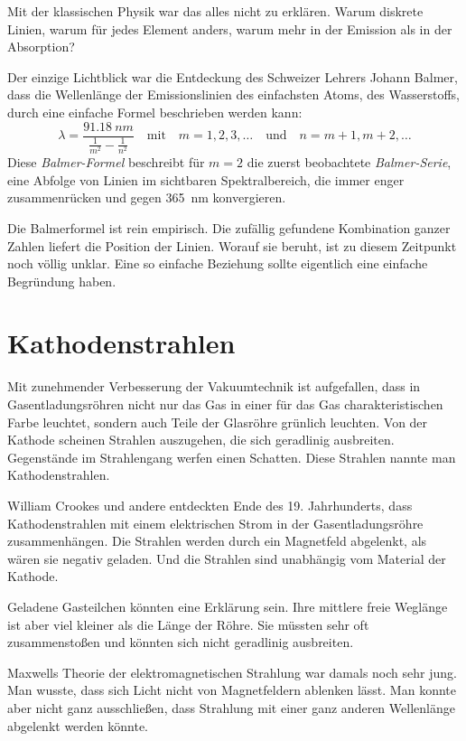 Mit der klassischen Physik war das alles nicht zu erklären. Warum diskrete Linien, warum für jedes Element anders, warum mehr in der Emission als in der Absorption?

Der einzige Lichtblick war die Entdeckung des Schweizer Lehrers Johann Balmer, dass die Wellenlänge der Emissionslinien des einfachsten Atoms, des Wasserstoffs, durch eine einfache Formel beschrieben werden kann:
\begin{equation}
    \lambda = \frac{\SI{91.18}{nm}}{ 
       \frac{1}{m^2} - \frac{1}{n^2} 
    }
    \quad \text{mit} \quad m = 1,2, 3, \dots \quad \text{und} \quad n = m+1, m+2, \dots
\end{equation}
Diese \emph{Balmer-Formel} beschreibt für $m=2$ die zuerst beobachtete \emph{Balmer-Serie}, eine Abfolge von Linien im sichtbaren Spektralbereich, die immer enger zusammenrücken und gegen 365~nm konvergieren.  

Die Balmerformel ist rein empirisch. Die zufällig gefundene Kombination ganzer Zahlen liefert die Position der Linien. Worauf sie beruht, ist zu diesem Zeitpunkt noch völlig unklar. Eine so einfache Beziehung sollte eigentlich eine einfache Begründung haben.


\section{Kathodenstrahlen}

Mit zunehmender Verbesserung der Vakuumtechnik ist aufgefallen, dass in Gasentladungsröhren nicht nur das Gas in einer für das Gas charakteristischen Farbe leuchtet, sondern auch Teile der Glasröhre grünlich leuchten.  Von der Kathode scheinen Strahlen auszugehen, die sich geradlinig ausbreiten. Gegenstände im Strahlengang werfen einen Schatten. Diese Strahlen nannte man Kathodenstrahlen.

William Crookes und andere entdeckten Ende des 19. Jahrhunderts, dass Kathodenstrahlen mit einem elektrischen Strom in der Gasentladungsröhre zusammenhängen. Die Strahlen werden durch ein Magnetfeld abgelenkt, als wären sie negativ geladen. Und die Strahlen sind unabhängig vom Material der Kathode.

Geladene Gasteilchen könnten eine Erklärung sein. Ihre mittlere freie Weglänge ist aber viel kleiner als die Länge der Röhre. Sie müssten sehr oft zusammenstoßen und könnten sich nicht geradlinig ausbreiten.

Maxwells Theorie der elektromagnetischen Strahlung war damals noch sehr jung. Man wusste, dass sich Licht nicht von Magnetfeldern ablenken lässt. Man konnte aber nicht ganz ausschließen, dass Strahlung mit einer ganz anderen Wellenlänge abgelenkt werden könnte.


